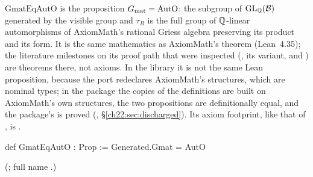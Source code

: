 \begin{definition}\label{ch22:def:GmatEqAutO}
$\mathrm{GmatEqAutO}$ is the proposition $G_{\mathrm{mat}}=\mathrm{AutO}$: the subgroup of $\mathrm{GL}_{\mathbb{Q}}(\mathcal{B})$
generated by the visible group and $\tau_B$ is the full group of ${\mathbb{Q}}$-linear automorphisms of AxiomMath's rational Griess
algebra preserving its product and its form.  It is the same mathematics as AxiomMath's theorem 
(Lean~4.35); the literature milestones on its proof path that were
inspected (, its  variant, and
) are theorems there, not axioms.  In the library it is not the same Lean
proposition, because the port redeclares AxiomMath's structures, which are nominal types; in the package
 the copies of the definitions are built on AxiomMath's own structures, the two propositions are
definitionally equal, and the package's  is proved (, \S\ref{ch22:sec:discharged}).  Its
axiom footprint, like that of , is .
\end{definition}
\begin{leancode}
def GmatEqAutO : Prop :=
  Generated.Gmat = AutO
\end{leancode}
(; full name .)

